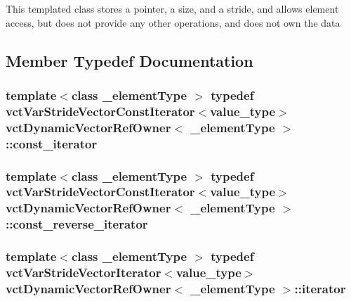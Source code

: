 This templated class stores a pointer, a size, and a stride, and allows element access, but does not provide any other operations, and does not own the data 

\subsection{Member Typedef Documentation}
\hypertarget{classvct_dynamic_vector_ref_owner_a4f7a05e13925c0eeb1d5c754c3193ba0}{
\subsubsection[{const\-\_\-iterator}]{\setlength{\rightskip}{0pt plus 5cm}template$<$class \-\_\-element\-Type $>$ typedef {\bf vct\-Var\-Stride\-Vector\-Const\-Iterator}$<$value\-\_\-type$>$ {\bf vct\-Dynamic\-Vector\-Ref\-Owner}$<$ \-\_\-element\-Type $>$\-::{\bf const\-\_\-iterator}}}\label{classvct_dynamic_vector_ref_owner_a4f7a05e13925c0eeb1d5c754c3193ba0}
\hypertarget{classvct_dynamic_vector_ref_owner_a9ab3900ecbd8f4d4eb4615a2c9a972a3}{
\subsubsection[{const\-\_\-reverse\-\_\-iterator}]{\setlength{\rightskip}{0pt plus 5cm}template$<$class \-\_\-element\-Type $>$ typedef {\bf vct\-Var\-Stride\-Vector\-Const\-Iterator}$<$value\-\_\-type$>$ {\bf vct\-Dynamic\-Vector\-Ref\-Owner}$<$ \-\_\-element\-Type $>$\-::{\bf const\-\_\-reverse\-\_\-iterator}}}\label{classvct_dynamic_vector_ref_owner_a9ab3900ecbd8f4d4eb4615a2c9a972a3}
\hypertarget{classvct_dynamic_vector_ref_owner_aaee0b96d24843f333909f2aba3aad782}{
\subsubsection[{iterator}]{\setlength{\rightskip}{0pt plus 5cm}template$<$class \-\_\-element\-Type $>$ typedef {\bf vct\-Var\-Stride\-Vector\-Iterator}$<$value\-\_\-type$>$ {\bf vct\-Dynamic\-Vector\-Ref\-Owner}$<$ \-\_\-element\-Type $>$\-::{\bf iterator}}}\label{classvct_dynamic_vector_ref_owner_aaee0b96d24843f333909f2aba3aad782}
